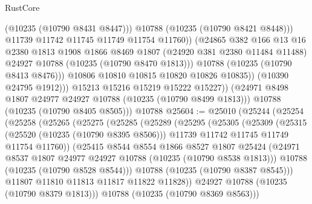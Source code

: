 \begin{lexlean}{RustCore}
\begin{coremodule}
                            (@10235 (@10790 @8431 @8447)))
                          @10788
                          (@10235 (@10790 @8421 @8448)))
                        @11739
                        @11742
                        @11745
                        @11749
                        @11754
                        @11760))
                    (@24865
                      @382
                      @166
                      @13
                      @16
                      @2380
                      @1813
                      @1908
                      @1866
                      @8469
                      @1807
                      (@24920 @381 @2380 @11484 @11488)
                      @24927
                      @10788
                      (@10235 (@10790 @8470 @1813)))
                    @10788
                    (@10235 (@10790 @8413 @8476)))
                  @10806
                  @10810
                  @10815
                  @10820
                  @10826
                  @10835))
              (@10390 @24795 @1912)))
          @15213
          @15216
          @15219
          @15222
          @15227))
      (@24971 @8498 @1807 @24977 @24927 @10788 (@10235 (@10790 @8499 @1813)))
      @10788
      (@10235 (@10790 @8405 @8505)))
    @10788
@25604 := @25010
    (@25244
      (@25254
        (@25258
          (@25265
            (@25275
              (@25285
                (@25289
                  (@25295
                    (@25305
                      (@25309
                        (@25315
                          (@25520 (@10235 (@10790 @8395 @8506)))
                          @11739
                          @11742
                          @11745
                          @11749
                          @11754
                          @11760))
                      (@25415
                        @8544
                        @8554
                        @1866
                        @8527
                        @1807
                        @25424
                        (@24971 @8537 @1807 @24977 @24927 @10788 (@10235 (@10790 @8538 @1813)))
                        @10788
                        (@10235 (@10790 @8528 @8544)))
                      @10788
                      (@10235 (@10790 @8387 @8545)))
                    @11807
                    @11810
                    @11813
                    @11817
                    @11822
                    @11828))
                @24927
                @10788
                (@10235 (@10790 @8379 @1813)))
              @10788
              (@10235 (@10790 @8369 @8563)))

\end{coremodule}
\end{lexlean}
